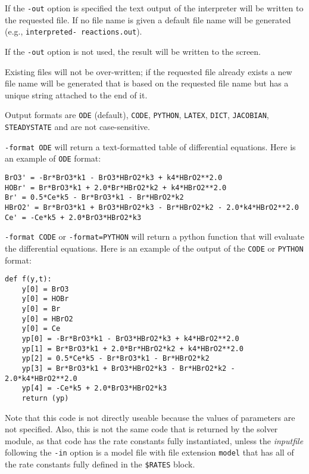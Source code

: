 If the {\tt -out} option is specified the text output of the interpreter will be written to the requested file. If no
file name is given a default file name will be generated (e.g., {\tt interpreted- reactions.out}). 

If the {\tt -out} option is not used, the result will be written to the screen.

Existing files will not be over-written; if the requested file already exists a new file name will be generated that is based on the requested file name but has a unique string attached to the end of it.

Output formats are {\tt ODE} (default), {\tt CODE}, {\tt PYTHON}, {\tt LATEX}, {\tt DICT}, {\tt JACOBIAN}, {\tt STEADYSTATE} and are not case-sensitive.

{\tt -format ODE} will return a text-formatted table of differential equations. Here is an example of {\tt ODE} format:

\begin{Verbatim}[frame=single]
BrO3' = -Br*BrO3*k1 - BrO3*HBrO2*k3 + k4*HBrO2**2.0
HOBr' = Br*BrO3*k1 + 2.0*Br*HBrO2*k2 + k4*HBrO2**2.0
Br' = 0.5*Ce*k5 - Br*BrO3*k1 - Br*HBrO2*k2
HBrO2' = Br*BrO3*k1 + BrO3*HBrO2*k3 - Br*HBrO2*k2 - 2.0*k4*HBrO2**2.0
Ce' = -Ce*k5 + 2.0*BrO3*HBrO2*k3
\end{Verbatim}

{\tt -format CODE} or {\tt -format=PYTHON} will return a python function that will evaluate the differential equations. Here is an example of the output of the {\tt CODE} or {\tt PYTHON} format:

\begin{Verbatim}[frame=single]
def f(y,t):
    y[0] = BrO3
    y[0] = HOBr
    y[0] = Br
    y[0] = HBrO2
    y[0] = Ce
    yp[0] = -Br*BrO3*k1 - BrO3*HBrO2*k3 + k4*HBrO2**2.0
    yp[1] = Br*BrO3*k1 + 2.0*Br*HBrO2*k2 + k4*HBrO2**2.0
    yp[2] = 0.5*Ce*k5 - Br*BrO3*k1 - Br*HBrO2*k2
    yp[3] = Br*BrO3*k1 + BrO3*HBrO2*k3 - Br*HBrO2*k2 - 2.0*k4*HBrO2**2.0
    yp[4] = -Ce*k5 + 2.0*BrO3*HBrO2*k3
    return (yp)
\end{Verbatim}

Note that this code is not directly useable because the values of parameters are not specified. Also, this is not the same code that is returned by the solver module, as that code has the rate constants fully instantiated, unless the \textit{inputfile} following the {\tt -in} option is a model file with file extension {\tt model} that has all of the rate constants fully defined in the {\tt \$RATES} block. 

